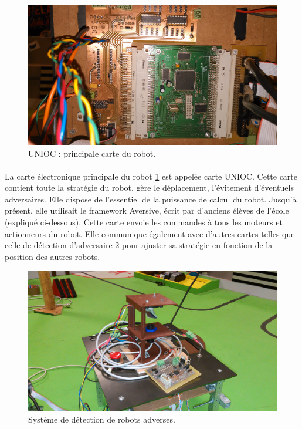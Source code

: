 \begin{figure}[!h]
\centering
\includegraphics[scale=0.1]{unioc}
\caption{UNIOC : principale carte du robot.}
\label{unioc}
\end{figure}

\paragraph{}
La carte électronique principale du robot \ref{unioc} est appelée carte UNIOC. Cette carte contient toute la stratégie du robot, gère le déplacement, l'évitement d'éventuels adversaires. Elle dispose de l'essentiel de la puissance de calcul du robot. Jusqu'à présent, elle utilisait le framework Aversive, écrit par d'anciens élèves de l'école (expliqué ci-dessous). Cette carte envoie les commandes à tous les moteurs et actionneurs du robot. Elle communique également avec d'autres cartes telles que celle de détection d'adversaire \ref{rds} pour ajuster sa stratégie en fonction de la position des autres robots.

\begin{figure}[!h]
\centering
\includegraphics[scale=0.1]{rds}
\caption{Système de détection de robots adverses.}
\label{rds}
\end{figure}

